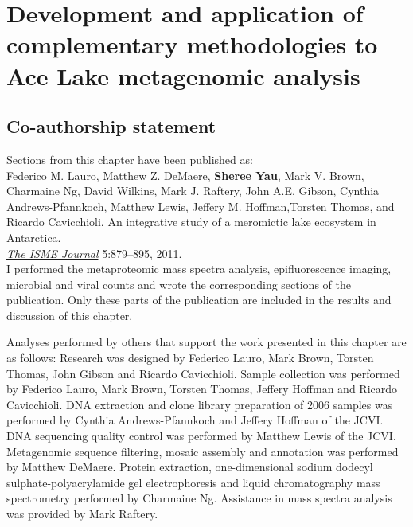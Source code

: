 \chapter[Development and application of complementary methodologies to Ace Lake metagenomic analysis]{Development and application of complementary methodologies to Ace Lake metagenomic analysis}
\label{ch:ace}
\acresetall

\section*{Co-authorship statement}

Sections from this chapter have been published as:\\

Federico M. Lauro, Matthew Z. DeMaere, \textbf{Sheree Yau}, Mark V. Brown, Charmaine Ng,
David Wilkins, Mark J. Raftery, John A.E. Gibson, Cynthia Andrews-Pfannkoch, Matthew Lewis,
Jeffery M. Hoffman,Torsten Thomas, and Ricardo Cavicchioli. 
An integrative study of a meromictic lake ecosystem in Antarctica.\\
\emph{\underline{The ISME Journal}} 
5:879--895, 2011.\\

I performed the metaproteomic mass spectra analysis, epifluorescence imaging,
microbial and viral counts and wrote the corresponding sections of the publication.
Only these parts of the publication are included in the results and discussion of this chapter.

Analyses performed by others that support the work presented in this chapter are as follows:
Research was designed by Federico Lauro, Mark Brown, Torsten Thomas, John Gibson and Ricardo Cavicchioli.
Sample collection was performed by Federico Lauro, Mark Brown, Torsten Thomas, Jeffery Hoffman and Ricardo Cavicchioli.
\textsc{DNA} extraction and clone library preparation of 2006 samples was performed by Cynthia Andrews-Pfannkoch and Jeffery Hoffman of the \ac{JCVI}.
\textsc{DNA} sequencing quality control was performed by Matthew Lewis of the \ac{JCVI}.
Metagenomic sequence filtering, mosaic assembly and annotation was performed by Matthew DeMaere.
Protein extraction, one-dimensional sodium dodecyl sulphate-polyacrylamide gel electrophoresis and liquid chromatography mass spectrometry performed by Charmaine Ng.
Assistance in mass spectra analysis was provided by Mark Raftery.
\newpage

